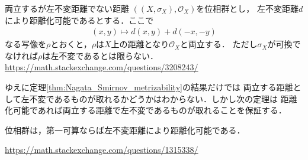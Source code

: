 	\begin{itembox}[l]{両立するが左不変距離でない距離}
		$\left(\left(X,\sigma_X\right),\mathscr{O}_X\right)$を位相群とし，
		左不変距離$d$により距離化可能であるとする．ここで
		\begin{align}
			(x,y) \longmapsto d(x,y) + d(-x,-y)
		\end{align}
		なる写像を$\rho$とおくと，$\rho$は$X$上の距離となり$\mathscr{O}_X$と両立する．
		ただし$\sigma_X$が可換でなければ$\rho$は左不変であるとは限らない．
		\url{https://math.stackexchange.com/questions/3208243/}
	\end{itembox}
	
	ゆえに定理\ref{thm:Nagata_Smirnov_metrizability}の結果だけでは
	両立する距離として左不変であるものが取れるかどうかはわからない．しかし次の定理は
	距離化可能であれば両立する距離で左不変であるものが取れることを保証する．
	
	\begin{screen}
		\begin{thm}
			位相群は，第一可算ならば左不変距離により距離化可能である．
		\end{thm}
	\end{screen}
	
	\begin{sketch}
		\url{https://math.stackexchange.com/questions/1315338/}
	\end{sketch}